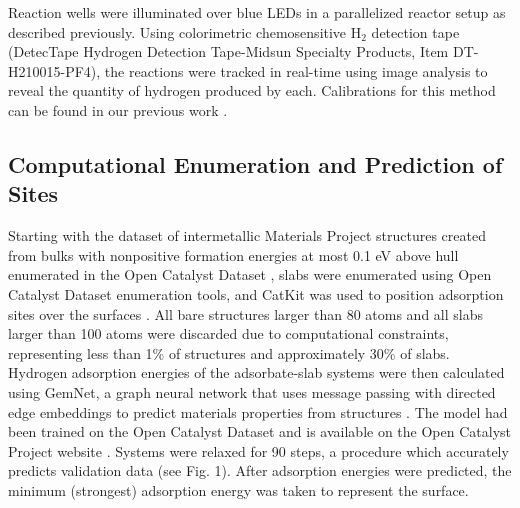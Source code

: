 \documentclass[preprint,12pt]{elsarticle}
\begin{document}
Reaction wells were illuminated over blue LEDs in a parallelized reactor setup as described previously. Using colorimetric chemosensitive H$_2$ detection tape (DetecTape Hydrogen Detection Tape-Midsun Specialty Products, Item DT-H210015-PF4), the reactions were tracked in real-time using image analysis to reveal the quantity of hydrogen produced by each. Calibrations for this method can be found in our previous work \cite{lopato2020parallelized}.


\subsection{Computational Enumeration and Prediction of Sites}\label{Section:Experimental/Enumeration}
Starting with the dataset of intermetallic Materials Project structures created from bulks with nonpositive formation energies at most 0.1 eV above hull enumerated in the Open Catalyst Dataset \cite{chanussot2021open,ong2013python}, slabs were enumerated using Open Catalyst Dataset enumeration tools, and CatKit was used to position adsorption sites over the surfaces \cite{boes2019graph}. All bare structures larger than 80 atoms and all slabs larger than 100 atoms were discarded due to computational constraints, representing less than 1\% of structures and approximately 30\% of slabs. Hydrogen adsorption energies of the adsorbate-slab systems were then calculated using GemNet, a graph neural network that uses message passing with directed edge embeddings to predict materials properties from structures \cite{klicpera2021gemnet}. The model had been trained on the Open Catalyst Dataset and is available on the Open Catalyst Project website \cite{chanussot2021open}. Systems were relaxed for 90 steps, a procedure which accurately predicts validation data (see Fig. 1). After adsorption energies were predicted, the minimum (strongest) adsorption energy was taken to represent the surface. 
\end{document}
